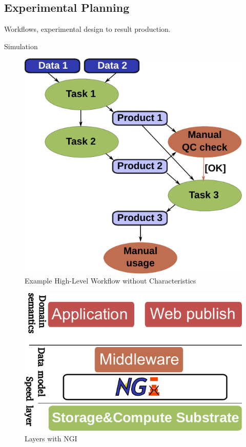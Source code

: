 \documentclass[a4paper, twocolumn]{article}
\begin{document}
\subsection{Experimental Planning}

Workflows, experimental design to result production.

Simulation


\begin{figure}[b]
  \centering
  \includegraphics[width=0.75\columnwidth]{workflow}
  \caption{Example High-Level Workflow without Characteristics}
  \label{fig:workflow}
\end{figure}



\begin{figure}[b]
  \centering
  \includegraphics[width=0.75\columnwidth]{layers-ngi}
  \caption{Layers with NGI}
  \label{fig:ngilayers}
\end{figure}
\end{document}
